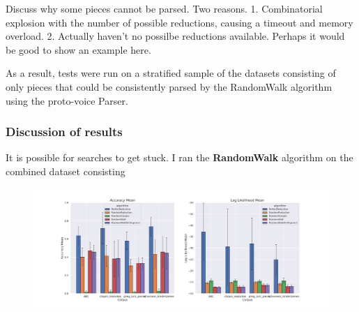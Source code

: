 \documentclass[12pt,a4paper,twoside,openany]{report} \usepackage[pdfborder={0 0 0}]{hyperref}    %
\theoremstyle{definition} \newtheorem{definition}{Definition}[section]
\begin{document}
  Discuss why some pieces cannot be parsed. Two reasons. 1. Combinatorial explosion with the number of possible
  reductions, causing a timeout and memory overload. 2. Actually haven't no possilbe reductions available. Perhaps it
  would be good to show an example here.

  As a result, tests were run on a stratified sample of the datasets consisting of only pieces that could be
  consistently parsed by the RandomWalk algorithm using the proto-voice Parser. 

  \subsubsection{Discussion of results}
  It is possible for searches to get stuck. I ran the \textbf{RandomWalk} algorithm on the combined dataset consisting

  \begin{figure}[h]

    \includegraphics[width=\textwidth]{figs/eval/baselineResults.png}
    \caption{}
    \label{fig:}
  \end{figure}
  
\end{document}
